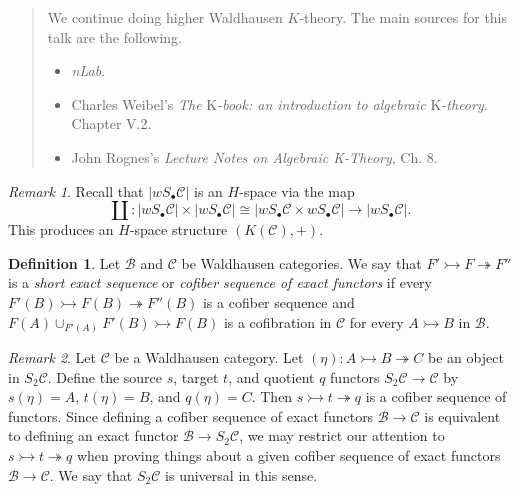 \documentclass[10pt,letterpaper,cm]{nupset}
\theoremstyle{definition}
\newtheorem{definition}{Definition}
\theoremstyle{theorem}
\theoremstyle{remark}
\newtheorem{remark}{Remark}
\newcommand{\1}{\mathbf{1}}
\renewcommand{\b}{\mathscr{B}}
\renewcommand{\c}{\mathscr{C}}
\newcommand{\0}{\vec 0}
\begin{document}
\begin{abstract}
We continue doing higher Waldhausen $K$-theory. The main sources for this talk are the following.
\begin{itemize}
\item \textit{nLab}.
\item Charles Weibel's \textit{The} K\textit{-book: an introduction to algebraic} K\textit{-theory}.  Chapter V.2.
\item John Rognes's \textit{Lecture Notes on Algebraic K-Theory}, Ch. 8.
\end{itemize}
\end{abstract}

\begin{remark}
Recall that $|wS_{\bullet} \c|$ is an $H$-space via the map $$\coprod: |wS_{\bullet} \c| \times |wS_{\bullet} \c| \cong |wS_{\bullet} \c \times  wS_{\bullet} \c|\to |wS_{\bullet} \c|.$$ This produces an $H$-space structure $(K(\c), +)$.
\end{remark}

\begin{definition}
Let $\b$ and $\c$ be Waldhausen categories. We say that $F' \rightarrowtail F \twoheadrightarrow F''$ is a \textit{short exact sequence} or \textit{cofiber sequence of exact functors} if every $F'(B) \rightarrowtail F(B) \twoheadrightarrow F''(B)$ is a cofiber sequence and $F(A) \cup_{F'(A)} F'(B) \rightarrowtail F(B)$ is a cofibration in $\c$ for every $A \rightarrowtail B$ in $\b$.
\end{definition}

\begin{remark}
Let $\c$ be a Waldhausen category. Let $(\eta): A \rightarrowtail B \twoheadrightarrow C$ be an object in $S_2\c$. Define the source $s$, target $t$, and quotient $q$ functors $S_2\c \to \c$ by $s(\eta) = A$, $t(\eta) = B$, and $q(\eta) = C$. Then $s \rightarrowtail t \twoheadrightarrow q$ is a cofiber sequence of functors. Since defining a cofiber sequence of exact functors $\b \to \c$ is equivalent to defining an exact functor $\b \to S_2 \c$, we may restrict our attention to $s \rightarrowtail t \twoheadrightarrow q$ when proving things about a given cofiber sequence of exact functors $\b \to \c$. We say that $S_2\c$ is universal in this sense.
\end{remark}
\end{document}
